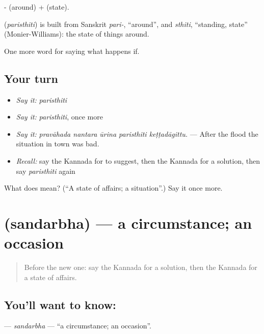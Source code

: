 - (around) +  (state).

\begin{cousinweb}
\textbf{} (\emph{paristhiti}) is built from Sanskrit \emph{pari-}, \textquotedblleft{}around\textquotedblright{}, and \emph{sthiti}, \textquotedblleft{}standing, state\textquotedblright{} (Monier-Williams): the state of things around.
\end{cousinweb}

\begin{grammarlens}[title={What you've built}]
One more word for saying what happens if.
\end{grammarlens}

\subsection*{Your turn}
\begin{itemize}
\raggedright
  \item \emph{Say it:} \emph{paristhiti}
  \item \emph{Say it:} \emph{paristhiti}, once more
  \item \emph{Say it:} \emph{pravāhada nantara ūrina paristhiti keṭṭadāgittu.} — After the flood the situation in town was bad.
  \item \emph{Recall:} say the Kannada for to suggest, then the Kannada for a solution, then say \emph{paristhiti} again
\end{itemize}

\begin{tcolorbox}[breakable,colback=teal!4,colframe=teal!35!black,title={Before you move on}]
What does  mean? (\textquotedblleft{}A state of affairs; a situation\textquotedblright{}.) Say it once more.
\end{tcolorbox}
\section[\texorpdfstring{\kn{ಸಂದರ್ಭ} (sandarbha)}{ಸಂದರ್ಭ (sandarbha)}]{ (sandarbha) — a circumstance; an occasion}

\label{lesson:KA-C430-sandarbha}



\begin{quote}
Before the new one: say the Kannada for a solution, then the Kannada for a state of affairs.
\end{quote}

\subsection*{You'll want to know: }
\textbf{} — \emph{sandarbha} — \textquotedblleft{}a circumstance; an occasion\textquotedblright{}.

